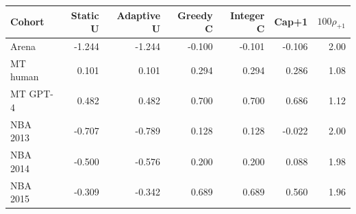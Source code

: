 \begin{tabular}{lrrrrrr}
\toprule
Cohort & Static U & Adaptive U & Greedy C & Integer C & Cap+1 & $100\rho_{{+1}}$ \\
\midrule
Arena & -1.244 & -1.244 & -0.100 & -0.101 & -0.106 & 2.00 \\
MT human & 0.101 & 0.101 & 0.294 & 0.294 & 0.286 & 1.08 \\
MT GPT-4 & 0.482 & 0.482 & 0.700 & 0.700 & 0.686 & 1.12 \\
NBA 2013 & -0.707 & -0.789 & 0.128 & 0.128 & -0.022 & 2.00 \\
NBA 2014 & -0.500 & -0.576 & 0.200 & 0.200 & 0.088 & 1.98 \\
NBA 2015 & -0.309 & -0.342 & 0.689 & 0.689 & 0.560 & 1.96 \\
\bottomrule
\end{tabular}
